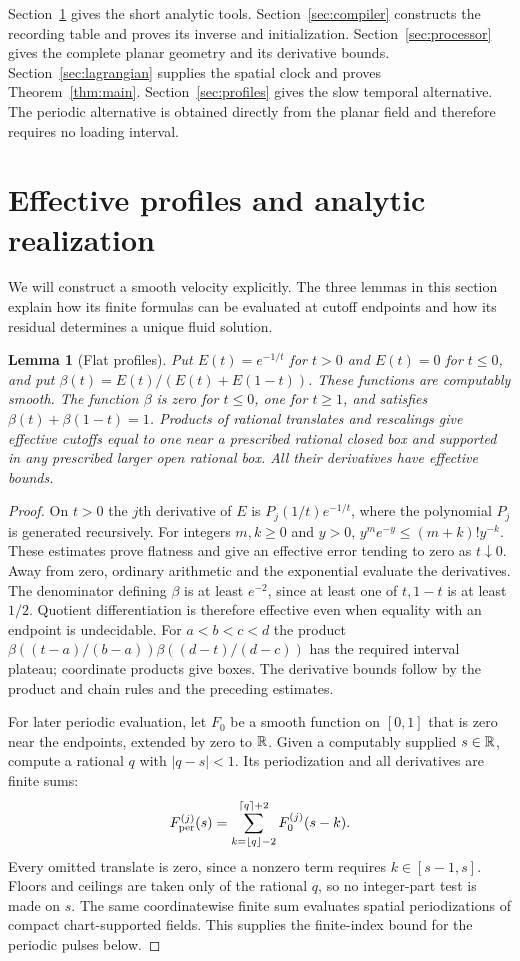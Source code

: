 \documentclass[11pt]{article}
\newtheorem{lemma}[theorem]{Lemma}
\theoremstyle{remark}\newtheorem{remark}[theorem]{Remark}
\begin{document}
Section~\ref{sec:analytic} gives the short analytic tools. Section~\ref{sec:compiler}
constructs the recording table and proves its inverse and initialization.
Section~\ref{sec:processor} gives the complete planar geometry and its
derivative bounds. Section~\ref{sec:lagrangian} supplies the spatial
clock and proves Theorem~\ref{thm:main}. Section~\ref{sec:profiles}
gives the slow temporal alternative. The periodic alternative is obtained
directly from the planar field and therefore requires no loading interval.

\section{Effective profiles and analytic realization}\label{sec:analytic}
We will construct a smooth velocity explicitly. The three lemmas in this
section explain how its finite formulas can be evaluated at cutoff
endpoints and how its residual determines a unique fluid solution.

\begin{lemma}[Flat profiles]\label{lem:profiles}
Put $E(t)=e^{-1/t}$ for $t>0$ and $E(t)=0$ for $t\le0$, and put
$\beta(t)=E(t)/(E(t)+E(1-t))$. These functions are computably smooth.
The function $\beta$ is zero for $t\le0$, one for $t\ge1$, and satisfies
$\beta(t)+\beta(1-t)=1$. Products of rational translates and rescalings
give effective cutoffs equal to one near a prescribed rational closed
box and supported in any prescribed larger open rational box.
All their derivatives have effective bounds.
\end{lemma}
\begin{proof}
On $t>0$ the $j$th derivative of $E$ is
$P_j(1/t)e^{-1/t}$, where the polynomial $P_j$ is generated recursively.
For integers $m,k\ge0$ and $y>0$,
$y^m e^{-y}\le(m+k)!y^{-k}$. These estimates prove flatness and give
an effective error tending to zero as $t\downarrow0$. Away from zero,
ordinary arithmetic and the exponential evaluate the derivatives.
The denominator defining $\beta$ is at least $e^{-2}$, since at least
one of $t,1-t$ is at least $1/2$. Quotient differentiation is therefore
effective even when equality with an endpoint is undecidable.
For $a<b<c<d$ the product
$\beta((t-a)/(b-a))\beta((d-t)/(d-c))$ has the required interval
plateau; coordinate products give boxes. The derivative bounds follow
by the product and chain rules and the preceding estimates.

For later periodic evaluation, let $F_0$ be a smooth function on $[0,1]$
that is zero near the endpoints, extended by zero to $\mathbb R$.
Given a computably supplied $s\in\mathbb R$, compute a rational $q$ with
$|q-s|<1$. Its periodization and all derivatives are finite sums:
\[
 F_{\rm per}^{(j)}(s)=
 \sum_{k=\lfloor q\rfloor-2}^{\lceil q\rceil+2}F_0^{(j)}(s-k).
\]
Every omitted translate is zero, since a nonzero term requires
$k\in[s-1,s]$. Floors and ceilings are taken only of the rational $q$,
so no integer-part test is made on $s$. The same coordinatewise finite
sum evaluates spatial periodizations of compact chart-supported fields.
This supplies the finite-index bound for the periodic pulses below.
\end{proof}
\end{document}
